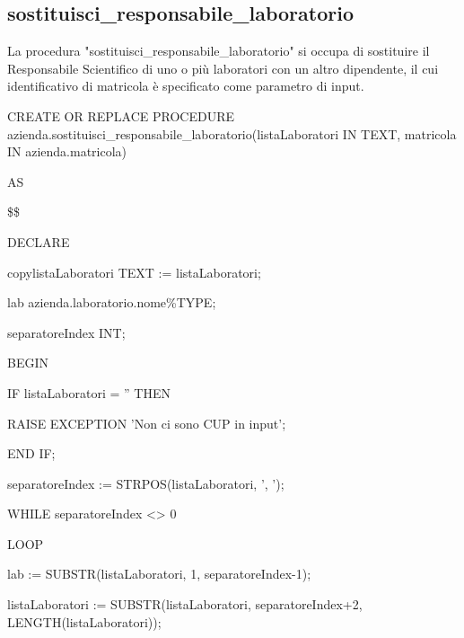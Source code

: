         \subsection{sostituisci\_responsabile\_laboratorio}
        La procedura "sostituisci\_responsabile\_laboratorio" si occupa di sostituire il Responsabile Scientifico di uno o più laboratori con un altro dipendente, il cui identificativo di matricola è specificato come parametro di input.
        \ttfamily
            \begin{flushleft}
                \begin{description}
                    \item CREATE OR REPLACE PROCEDURE azienda.sostituisci\_responsabile\_laboratorio(listaLaboratori IN TEXT, matricola IN azienda.matricola)   
                    \item AS
                    \item \$\$
                    \item DECLARE
                    \begin{description}
                        \item copylistaLaboratori TEXT := listaLaboratori;
                        \item lab azienda.laboratorio.nome\%TYPE;
                        \item separatoreIndex INT;
                    \end{description}
                    \item BEGIN 
                    \begin{description}
                        \item IF listaLaboratori = '' THEN
                        \begin{description}
                            \item RAISE EXCEPTION 'Non ci sono CUP in input';
                        \end{description}
                        \item END IF;
                        \item separatoreIndex := STRPOS(listaLaboratori, ', ');
                        
                        \vspace{0.5cm}

                        \item WHILE separatoreIndex <> 0
                        \item LOOP
                        \begin{description}
                            \item lab := SUBSTR(listaLaboratori, 1, separatoreIndex-1);
                            \item listaLaboratori := SUBSTR(listaLaboratori, separatoreIndex+2, LENGTH(listaLaboratori));
                            

\end{description}
\end{description}
\end{description}
\end{flushleft}
